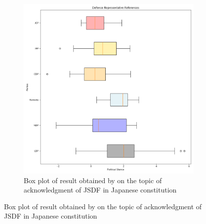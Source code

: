 \documentclass[final,5p,times,twocolumn,authoryear]{elsarticle}
\begin{document}
\FloatBarrier
\begin{figure}
\centering
    \begin{subfigure}{0.3\textwidth}
      \centering
      \includegraphics[width=1\linewidth]{figs/defence_box_plot.png}
      \caption{Box plot of result obtained by \citeauthor{kato2024lupinllmbasedpoliticalideology} on the topic of acknowledgment of JSDF in Japanese constitution}
      \label{fig:sub1}
    \end{subfigure}
    

\end{figure}
\end{document}
